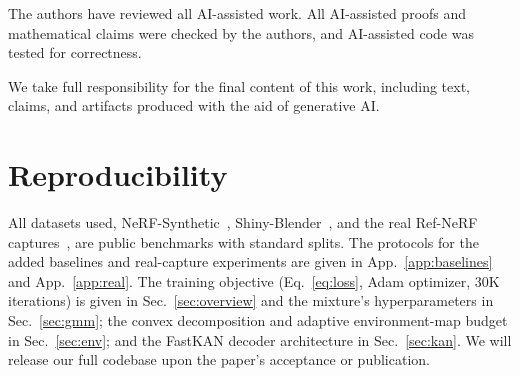 The authors have reviewed all AI-assisted work. All AI-assisted proofs and mathematical claims were checked by the authors, and AI-assisted code was tested for correctness. 

We take full responsibility for the final content of this work, including text, claims, and artifacts produced with the aid of generative AI.


\section{Reproducibility}
All datasets used, NeRF-Synthetic~\citep{NeRFVanilla}, Shiny-Blender~\citep{refnerf}, and the
real Ref-NeRF captures~\citep{refnerf, bakingNeRF}, are public benchmarks with standard splits. The
protocols for the added baselines and real-capture experiments are given in App.~\ref{app:baselines}
and App.~\ref{app:real}. The training objective
(Eq.~\eqref{eq:loss}, Adam optimizer, 30K iterations) is given in Sec.~\ref{sec:overview} and the mixture's hyperparameters in Sec.~\ref{sec:gmm}; the convex
decomposition and adaptive environment-map budget in Sec.~\ref{sec:env}; and the FastKAN decoder
architecture in Sec.~\ref{sec:kan}. We will release our full codebase upon the paper's acceptance or
publication.

